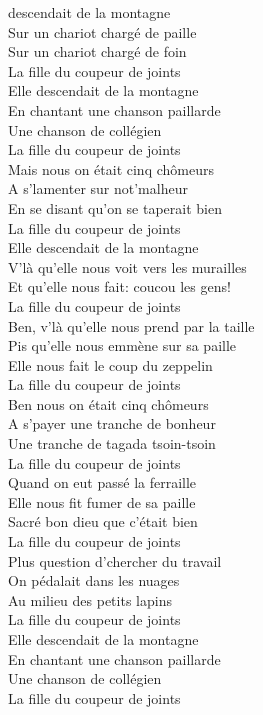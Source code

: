 
 descendait de la montagne
\\Sur un chariot chargé de paille
\\Sur un chariot chargé de foin
\\La fille du coupeur de joints \bissimple
\\Elle descendait de la montagne
\\En chantant une chanson paillarde
\\Une chanson de collégien
\\La fille du coupeur de joints \bissimple
\\Mais nous on était cinq chômeurs
\\A s'lamenter sur not'malheur
\\En se disant qu'on se taperait bien
\\La fille du coupeur de joints \bissimple
\\Elle descendait de la montagne
\\V'là qu'elle nous voit vers les murailles
\\Et qu'elle nous fait: coucou les gens!
\\La fille du coupeur de joints \bissimple
\\Ben, v'là qu'elle nous prend par la taille
\\Pis qu'elle nous emmène sur sa paille
\\Elle nous fait le coup du zeppelin
\\La fille du coupeur de joints \bissimple
\\Ben nous on était cinq chômeurs
\\A s'payer une tranche de bonheur
\\Une tranche de tagada tsoin-tsoin
\\La fille du coupeur de joints \bissimple
\\Quand on eut passé la ferraille
\\Elle nous fit fumer de sa paille
\\Sacré bon dieu que c'était bien
\\La fille du coupeur de joints \bissimple
\\Plus question d'chercher du travail
\\On pédalait dans les nuages
\\Au milieu des petits lapins
\\La fille du coupeur de joints \bissimple
\\Elle descendait de la montagne
\\En chantant une chanson paillarde
\\Une chanson de collégien
\\La fille du coupeur de joints \bissimple
\breakpage